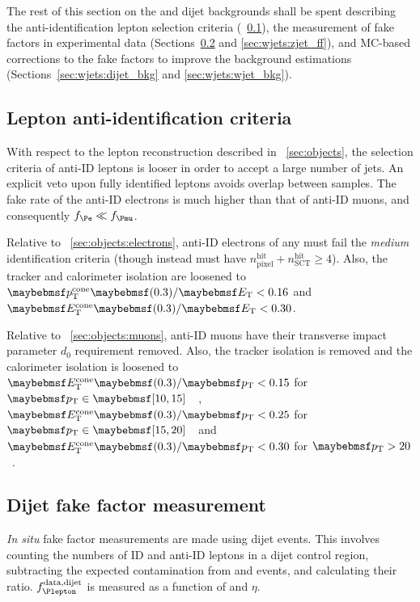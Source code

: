 The rest of this section on the \Wjets and dijet backgrounds shall be spent describing 
the anti-identification lepton selection criteria (\Section~\ref{sec:wjets:antiid}), the 
measurement of fake factors in experimental data (Sections~\ref{sec:wjets:dijet_ff} and 
\ref{sec:wjets:zjet_ff}), and MC-based corrections to the fake factors to improve the 
background estimations (Sections~\ref{sec:wjets:dijet_bkg} and \ref{sec:wjets:wjet_bkg}).



\subsection{Lepton anti-identification criteria}
\label{sec:wjets:antiid}

With respect to the lepton reconstruction described in \Section~\ref{sec:objects}, the 
selection criteria of anti-ID leptons is looser in order to accept a large number of 
jets. An explicit veto upon fully identified leptons avoids overlap between samples. 
The fake rate of the anti-ID electrons is much higher than that of anti-ID muons, and 
consequently $f_{\Pe} \ll f_{\Pmu}$.

Relative to \Section~\ref{sec:objects:electrons}, anti-ID electrons of any \pt must fail 
the \textit{medium} identification criteria (though instead must have 
$n_{\text{pixel}}^{\text{hit}} + n_{\text{SCT}}^{\text{hit}} \geq 4$). Also, the tracker 
and calorimeter isolation are loosened to $\ptcone{0.3}/\et < 0.16$ and 
$\etcone{0.3}/\et < 0.30$.

Relative to \Section~\ref{sec:objects:muons}, anti-ID muons have their transverse impact 
parameter $d_0$ requirement removed. Also, the tracker isolation is removed and the 
calorimeter isolation is loosened to $\etcone{0.3}/\pt < 0.15$ for 
\unit{$\pt \in \hardrange{10,15}$}{\GeV}, $\etcone{0.3}/\pt < 0.25$ for 
\unit{$\pt \in \hardrange{15,20}$}{\GeV} and $\etcone{0.3}/\pt < 0.30$ for 
\unit{$\pt > 20$}{\GeV}.





\subsection{Dijet fake factor measurement}
\label{sec:wjets:dijet_ff}

\textit{In situ} fake factor measurements are made using dijet events. This involves 
counting the numbers of ID and anti-ID leptons in a dijet control region, subtracting the 
expected contamination from \PW and \PZ events, and calculating their ratio. 
$f_{\Plepton}^{\text{data,dijet}}$ is measured as a function of \pt and $\eta$.

